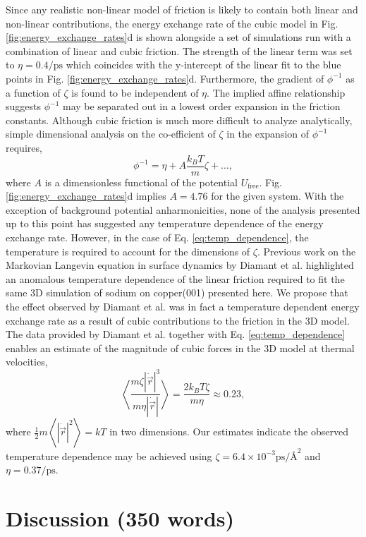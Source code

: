 \documentclass[7pt]{article}
\newcommand{\ips}{\si{\per\pico\second}}
\newcommand{\uzeta}{\si{\pico\second\per\angstrom\squared}}
\begin{document}
Since any realistic non-linear model of friction is likely to contain both linear and non-linear contributions, the energy exchange rate of the cubic model in Fig. \ref{fig:energy_exchange_rates}d is shown alongside a set of simulations run with a combination of linear and cubic friction. The strength of the linear term was set to $\eta=0.4\ips$ which coincides with the y-intercept of the linear fit to the blue points in Fig. \ref{fig:energy_exchange_rates}d. Furthermore, the gradient of $\phi^{-1}$ as a function of $\zeta$ is found to be independent of $\eta$. The implied affine relationship suggests $\phi^{-1}$ may be separated out in a lowest order expansion in the friction constants. Although cubic friction is much more difficult to analyze analytically, simple dimensional analysis on the co-efficient of $\zeta$ in the expansion of $\phi^{-1}$ requires,
\begin{equation}
	\phi^{-1} = \eta + A \frac{k_BT}{m} \zeta + \ldots,
	\label{eq:temp_dependence}
\end{equation}
where $A$ is a dimensionless functional of the potential $U_{\text{free}}$. Fig. \ref{fig:energy_exchange_rates}d implies $A = 4.76$ for the given system. With the exception of background potential anharmonicities, none of the analysis presented up to this point has suggested any temperature dependence of the energy exchange rate. However, in the case of Eq. \ref{eq:temp_dependence}, the temperature is required to account for the dimensions of $\zeta$. Previous work on the Markovian Langevin equation in surface dynamics by Diamant et al. highlighted an anomalous temperature dependence of the linear friction required to fit the same 3D simulation of sodium on copper(001) presented here\cite{Diamant}. We propose that the effect observed by Diamant et al. was in fact a temperature dependent energy exchange rate as a result of cubic contributions to the friction in the 3D model. The data provided by Diamant et al. together with Eq. \ref{eq:temp_dependence} enables an estimate of the magnitude of cubic forces in the 3D model at thermal velocities,
\begin{equation}
	\left<\frac{m\zeta|\dot{\vec{r}}|^3}{m\eta|\dot{\vec{r}}|}\right> = \frac{2k_BT\zeta}{m\eta} \approx 0.23,
\end{equation}
where $\frac{1}{2}m\left<|\dot{\vec{r}}|^2\right>=kT$ in two dimensions. Our estimates indicate the observed temperature dependence may be achieved using $\zeta = 6.4\times 10^{-3}\uzeta$ and $\eta=0.37\ips$. 

\section*{Discussion (350 words)}
\end{document}
